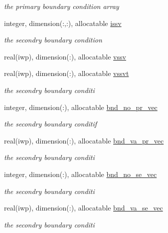 \begin{DoxyCompactItemize}
\begin{DoxyCompactList}\small\item\em the primary boundary condition array \end{DoxyCompactList}\item 
integer, dimension(\+:,\+:), allocatable \hyperlink{classfem__geometry_a43cd6cae2958cc6df56cf3eae9128075}{issv}
\begin{DoxyCompactList}\small\item\em the secondry boundary condition \end{DoxyCompactList}\item 
real(iwp), dimension(\+:), allocatable \hyperlink{classfem__geometry_a4e7c22284b2c19f02a5b9abe1fd64cb0}{vssv}
\item 
real(iwp), dimension(\+:), allocatable \hyperlink{classfem__geometry_a01643bdf277beb80ca579a4f1f45b179}{vssvt}
\begin{DoxyCompactList}\small\item\em the secondry boundary conditi \end{DoxyCompactList}\item 
integer, dimension(\+:), allocatable \hyperlink{classfem__geometry_a4629a0d999e34a1547afb75c9a64bcf5}{bnd\+\_\+no\+\_\+pr\+\_\+vec}
\begin{DoxyCompactList}\small\item\em the secondry boundary conditif \end{DoxyCompactList}\item 
real(iwp), dimension(\+:), allocatable \hyperlink{classfem__geometry_a5cf400a0df2f2bbcab52dbfa3918af3a}{bnd\+\_\+va\+\_\+pr\+\_\+vec}
\begin{DoxyCompactList}\small\item\em the secondry boundary conditi \end{DoxyCompactList}\item 
integer, dimension(\+:), allocatable \hyperlink{classfem__geometry_acf0254abaafe358f825a34f402babb1f}{bnd\+\_\+no\+\_\+se\+\_\+vec}
\begin{DoxyCompactList}\small\item\em the secondry boundary conditi \end{DoxyCompactList}\item 
real(iwp), dimension(\+:), allocatable \hyperlink{classfem__geometry_a0add746ed85a4361e704a080e0ee5040}{bnd\+\_\+va\+\_\+se\+\_\+vec}
\begin{DoxyCompactList}\small\item\em the secondry boundary conditi \end{DoxyCompactList}\item 

\end{DoxyCompactItemize}
